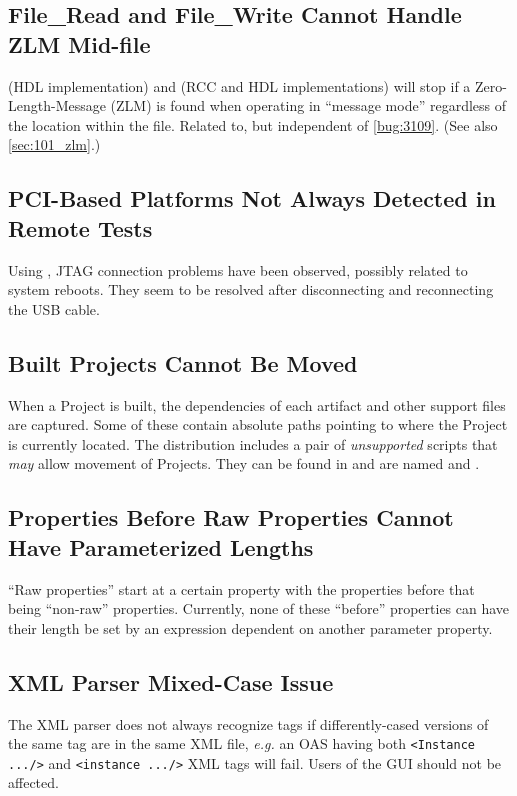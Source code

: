 \subsection{File\_Read and File\_Write Cannot Handle ZLM Mid-file} %
\label{bug:3107}
 (HDL implementation) and  (RCC and HDL implementations) will stop if a Zero-Length-Message (ZLM) is found when operating in ``message mode'' regardless of the location within the file. Related to, but independent of \ref{bug:3109}. (See also \ref{sec:101_zlm}.)

\subsection{PCI-Based Platforms Not Always Detected in Remote Tests} %
\label{bug:2477}
Using , JTAG connection problems have been observed, possibly related to system reboots. They seem to be resolved after disconnecting and reconnecting the USB cable.

\subsection{Built Projects Cannot Be Moved} %
\label{bug:3031}
When a Project is built, the dependencies of each artifact and other support files are captured. Some of these contain absolute paths pointing to where the Project is currently located. The distribution includes a pair of \textit{unsupported} scripts that \textit{may} allow movement of Projects. They can be found in  and are named  and .

\subsection{Properties Before Raw Properties Cannot Have Parameterized Lengths} %
\label{bug:2241}
``Raw properties'' start at a certain property with the properties before that being ``non-raw'' properties. Currently, none of these ``before'' properties can have their length be set by an expression dependent on another parameter property.

\subsection{XML Parser Mixed-Case Issue} %
\label{bug:1385}
The XML parser does not always recognize tags if differently-cased versions of the same tag are in the same XML file, \textit{e.g.} an OAS having both \texttt{<Instance .../>} and \texttt{<instance .../>} XML tags will fail. Users of the GUI should not be affected.

